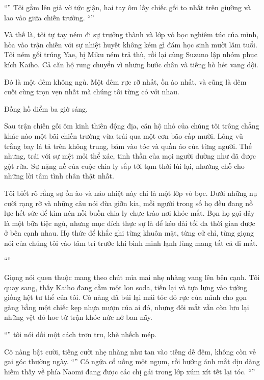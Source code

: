 \documentclass[../main.tex]{subfiles}
\begin{document}
``'' Tôi gầm lên giả vờ tức giận, hai tay ôm lấy chiếc gối to nhất trên giường và lao vào giữa chiến trường. ``''

Và thế là, tôi tự tay ném đi sự trưởng thành và lớp vỏ bọc nghiêm túc của mình, hòa vào trận chiến với sự nhiệt huyết không kém gì đám học sinh mười lăm tuổi. Tôi ném gối trúng Yae, bị Miku ném trả thù, rồi lại cùng Suzuno lập nhóm phục kích Kaiho. Cả căn hộ rung chuyển vì những bước chân và tiếng hò hét vang dội.

Đó là một đêm không ngủ. Một đêm rực rỡ nhất, ồn ào nhất, và cũng là đêm cuối cùng trọn vẹn nhất mà chúng tôi từng có với nhau.

\ct

Đồng hồ điểm ba giờ sáng.

Sau trận chiến gối ôm kinh thiên động địa, căn hộ nhỏ của chúng tôi trông chẳng khác nào một bãi chiến trường vừa trải qua một cơn bão cấp mười. Lông vũ trắng bay lả tả trên không trung, bám vào tóc và quần áo của từng người. Thế nhưng, trái với sự mệt mỏi thể xác, tinh thần của mọi người dường như đã được gột rửa. Sự nặng nề của cuộc chia ly sắp tới tạm thời lùi lại, nhường chỗ cho những lời tâm tình chân thật nhất.

Tôi biết rõ rằng sự ồn ào và náo nhiệt này chỉ là một lớp vỏ bọc. Dưới những nụ cười rạng rỡ và những câu nói đùa giỡn kia, mỗi người trong số họ đều đang nỗ lực hết sức để kìm nén nỗi buồn chia ly chực trào nơi khóe mắt. Bọn họ gọi đây là một bữa tiệc ngủ, nhưng mục đích thực sự là để kéo dài tối đa thời gian được ở bên cạnh nhau. Họ thức để khắc ghi từng khuôn mặt, từng cử chỉ, từng giọng nói của chúng tôi vào tâm trí trước khi bình minh lạnh lùng mang tất cả đi mất.

``''

Giọng nói quen thuộc mang theo chút mỉa mai nhẹ nhàng vang lên bên cạnh. Tôi quay sang, thấy Kaiho đang cầm một lon soda, tiến lại và tựa lưng vào tường giống hệt tư thế của tôi. Cô nàng đã búi lại mái tóc đỏ rực của mình cho gọn gàng bằng một chiếc kẹp nhựa mượn của ai đó, nhưng đôi mắt vẫn còn lưu lại những vệt đỏ hoe từ trận khóc nức nở ban nãy.

``'' tôi nói dối một cách trơn tru, khẽ nhếch mép.

Cô nàng bật cười, tiếng cười nhẹ nhàng như tan vào tiếng dế đêm, không còn vẻ gai góc thường ngày. ``'' Cô ngửa cổ uống một ngụm, rồi hướng ánh mắt dịu dàng hiếm thấy về phía Naomi đang được các chị gái trong lớp xúm xít tết lại tóc. ``''
\end{document}
